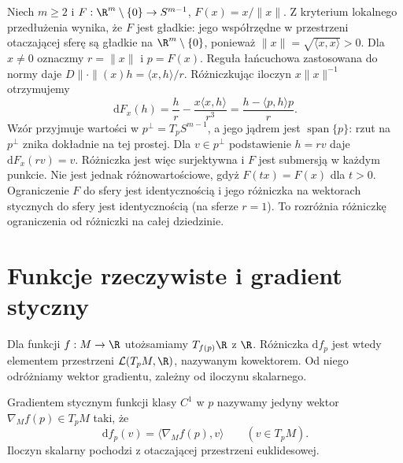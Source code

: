 \begin{przyklad}
\label{ma2:ex:radial-differential}
Niech $m\ge2$ i $F:\R^m\setminus\{0\}\to S^{m-1}$,
$F(x)=x/\|x\|$. Z kryterium lokalnego przedłużenia
wynika, że $F$ jest gładkie: jego współrzędne
w przestrzeni otaczającej sferę są gładkie
na $\R^m\setminus\{0\}$, ponieważ
$\|x\|=\sqrt{\langle x,x\rangle}>0$.
Dla $x\ne0$ oznaczmy $r=\|x\|$ i $p=F(x)$.
Reguła łańcuchowa zastosowana do normy daje
$D\|\cdot\|(x)h=\langle x,h\rangle/r$.
Różniczkując iloczyn $x\|x\|^{-1}$ otrzymujemy
\[
 \mathrm dF_x(h)=\frac{h}{r}
      -\frac{x\langle x,h\rangle}{r^3}
 =\frac{h-\langle p,h\rangle p}{r}.
\]
Wzór przyjmuje wartości w $p^\perp=T_pS^{m-1}$,
a jego jądrem jest $\operatorname{span}\{p\}$:
rzut na $p^\perp$ znika dokładnie na tej prostej.
Dla $v\in p^\perp$ podstawienie $h=rv$ daje
$\mathrm dF_x(rv)=v$. Różniczka jest więc
surjektywna i $F$ jest submersją w każdym punkcie.
Nie jest jednak różnowartościowe, gdyż
$F(tx)=F(x)$ dla $t>0$. Ograniczenie $F$ do
sfery jest identycznością i jego różniczka
na wektorach stycznych do sfery jest identycznością
(na sferze $r=1$). To rozróżnia różniczkę
ograniczenia od różniczki na całej dziedzinie.
\end{przyklad}

\section{Funkcje rzeczywiste i gradient styczny}

Dla funkcji $f:M\to\R$ utożsamiamy $T_{f(p)}\R$ z $\R$.
Różniczka $\mathrm df_p$ jest wtedy elementem przestrzeni
$\mathcal L(T_pM,\R)$, nazywanym kowektorem. Od niego
odróżniamy wektor gradientu, zależny od iloczynu skalarnego.

\begin{definicja}
\label{ma2:def:tangential-gradient}
Gradientem stycznym funkcji klasy $C^1$ w $p$ nazywamy
jedyny wektor $\nabla_M f(p)\in T_pM$ taki, że
\[
 \mathrm df_p(v)=\langle\nabla_M f(p),v\rangle
 \qquad(v\in T_pM).
\]
Iloczyn skalarny pochodzi z otaczającej przestrzeni
euklidesowej.
\end{definicja}

